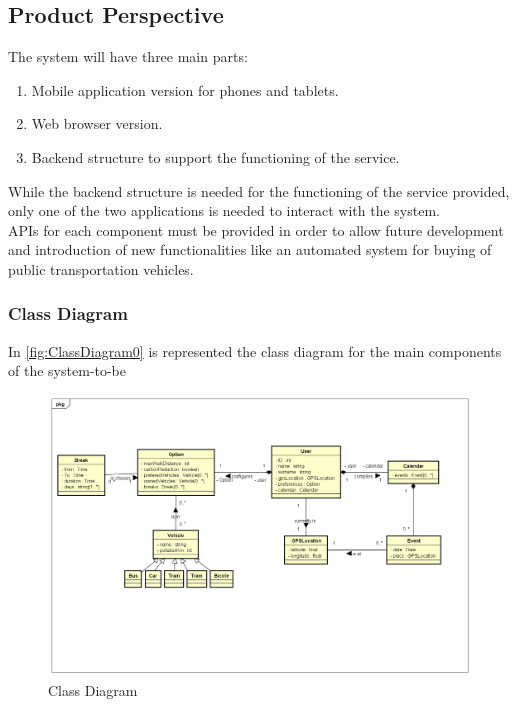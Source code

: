 \subsection{Product Perspective}
The system will have three main parts:
\begin{enumerate}
\item Mobile application version for phones and tablets.
\item Web browser version.
\item Backend structure to support the functioning of the service.
\end{enumerate}
While the backend structure is needed for the functioning of the service provided, only one of the two applications is needed to interact with the system.\\
APIs for each component must be provided in order to allow future development and introduction of new functionalities like an automated system for buying of public transportation vehicles.
\subsubsection*{Class Diagram}
In \autoref{fig:ClassDiagram0} is represented the class diagram for the main components of the system-to-be
\begin{figure}
\centering
	\includegraphics[width=\textwidth]{Img/ClassDiagram0}
	\caption{Class Diagram}
	\label{fig:ClassDiagram0}
\end{figure}
